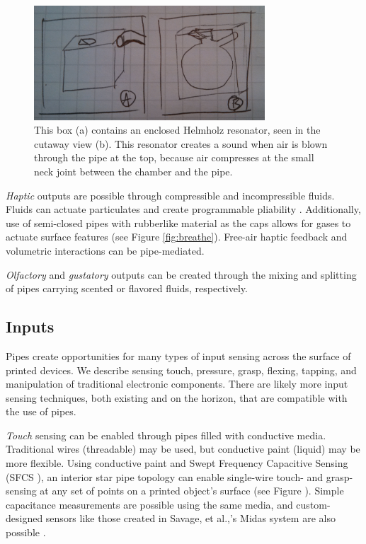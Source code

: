 \begin{figure}[h]
\centering
    \includegraphics[width=3.4in]{figures/placeholder/helmholz.jpg}
\caption{This box (a) contains an enclosed Helmholz resonator, seen in the cutaway view (b).  This resonator creates a sound when air is blown through the pipe at the top, because air compresses at the small neck joint between the chamber and the pipe.  }
\label{fig:ocarina}
\end{figure}

\emph{Haptic} outputs are possible through compressible and incompressible fluids.  Fluids can actuate particulates and create programmable pliability \cite{Follmer-jamming}.  Additionally, use of semi-closed pipes with rubberlike material as the caps allows for gases to actuate surface features (see Figure \ref{fig:breathe}).  Free-air haptic feedback \cite{Sodhi-aireal} and volumetric interactions \cite{Iwata-volflex} can be pipe-mediated.

\emph{Olfactory} and \emph{gustatory} outputs can be created through the mixing and splitting of pipes carrying scented or flavored fluids, respectively.

\subsection{Inputs}

Pipes create opportunities for many types of input sensing across the surface of printed devices.  We describe sensing touch, pressure, grasp, flexing, tapping, and manipulation of traditional electronic components.  There are likely more input sensing techniques, both existing and on the horizon, that are compatible with the use of pipes.

\emph{Touch} sensing can be enabled through pipes filled with conductive media.  Traditional wires (threadable) may be used, but conductive paint (liquid) may be more flexible.  Using conductive paint and Swept Frequency Capacitive Sensing (SFCS \cite{Sato-touche}), an interior star pipe topology can enable single-wire touch- and grasp-sensing at any set of points on a printed object's surface (see Figure \cite{fig:toys}).  Simple capacitance measurements are possible using the same media, and custom-designed sensors like those created in Savage, et al.,'s Midas system are also possible \cite{Savage-midas}.

